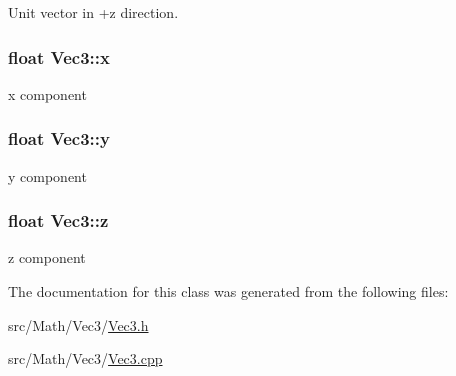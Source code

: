 Unit vector in +z direction. 

\subsubsection[{\texorpdfstring{x}{x}}]{\setlength{\rightskip}{0pt plus 5cm}float Vec3\+::x}\hypertarget{class_vec3_a2814580e9b9372738c0a61197ea46b51}{}\label{class_vec3_a2814580e9b9372738c0a61197ea46b51}


x component 

\subsubsection[{\texorpdfstring{y}{y}}]{\setlength{\rightskip}{0pt plus 5cm}float Vec3\+::y}\hypertarget{class_vec3_abc1d241232cb04aa98217a942402ae68}{}\label{class_vec3_abc1d241232cb04aa98217a942402ae68}


y component 

\subsubsection[{\texorpdfstring{z}{z}}]{\setlength{\rightskip}{0pt plus 5cm}float Vec3\+::z}\hypertarget{class_vec3_a64f3f00cd2dd9076999eeb2f05210388}{}\label{class_vec3_a64f3f00cd2dd9076999eeb2f05210388}


z component 



The documentation for this class was generated from the following files\+:\begin{DoxyCompactItemize}
\item 
src/\+Math/\+Vec3/\hyperlink{_vec3_8h}{Vec3.\+h}\item 
src/\+Math/\+Vec3/\hyperlink{_vec3_8cpp}{Vec3.\+cpp}\end{DoxyCompactItemize}
